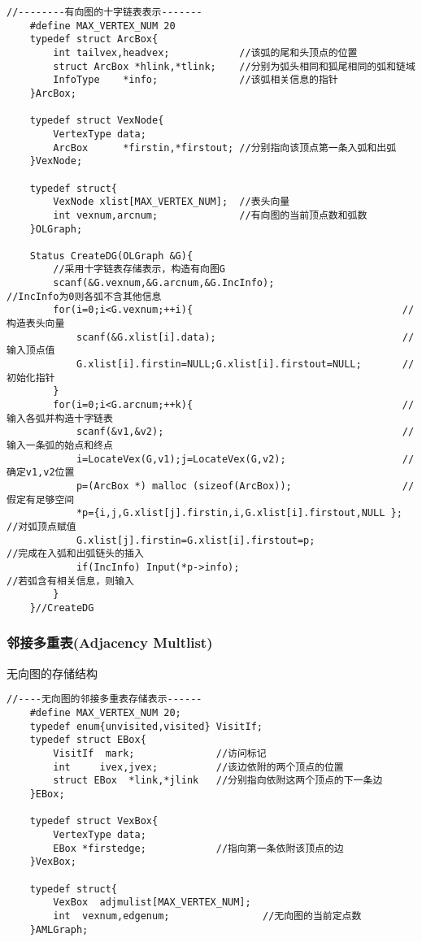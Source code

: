 \documentclass[UTF8]{ctexart}
\begin{document}
\begin{lstlisting}[style=v1]
    //--------有向图的十字链表表示-------
    #define MAX_VERTEX_NUM 20
    typedef struct ArcBox{
        int tailvex,headvex;            //该弧的尾和头顶点的位置
        struct ArcBox *hlink,*tlink;    //分别为弧头相同和狐尾相同的弧和链域
        InfoType    *info;              //该弧相关信息的指针
    }ArcBox;

    typedef struct VexNode{
        VertexType data;
        ArcBox      *firstin,*firstout; //分别指向该顶点第一条入弧和出弧          
    }VexNode;

    typedef struct{
        VexNode xlist[MAX_VERTEX_NUM];  //表头向量
        int vexnum,arcnum;              //有向图的当前顶点数和弧数
    }OLGraph;

    Status CreateDG(OLGraph &G){
        //采用十字链表存储表示，构造有向图G
        scanf(&G.vexnum,&G.arcnum,&G.IncInfo);                      //IncInfo为0则各弧不含其他信息
        for(i=0;i<G.vexnum;++i){                                    //构造表头向量
            scanf(&G.xlist[i].data);                                //输入顶点值
            G.xlist[i].firstin=NULL;G.xlist[i].firstout=NULL;       //初始化指针
        }
        for(i=0;i<G.arcnum;++k){                                    //输入各弧并构造十字链表
            scanf(&v1,&v2);                                         //输入一条弧的始点和终点
            i=LocateVex(G,v1);j=LocateVex(G,v2);                    //确定v1,v2位置
            p=(ArcBox *) malloc (sizeof(ArcBox));                   //假定有足够空间
            *p={i,j,G.xlist[j].firstin,i,G.xlist[i].firstout,NULL }; //对弧顶点赋值 
            G.xlist[j].firstin=G.xlist[i].firstout=p;                //完成在入弧和出弧链头的插入
            if(IncInfo) Input(*p->info);                             //若弧含有相关信息，则输入      
        }
    }//CreateDG
\end{lstlisting}

  
\newpage

\subsubsection{邻接多重表(Adjacency Multlist)}

无向图的存储结构

\begin{lstlisting}[style=v1]
    //----无向图的邻接多重表存储表示------
    #define MAX_VERTEX_NUM 20;
    typedef enum{unvisited,visited} VisitIf;        
    typedef struct EBox{
        VisitIf  mark;              //访问标记
        int     ivex,jvex;          //该边依附的两个顶点的位置
        struct EBox  *link,*jlink   //分别指向依附这两个顶点的下一条边
    }EBox;

    typedef struct VexBox{
        VertexType data;
        EBox *firstedge;            //指向第一条依附该顶点的边
    }VexBox;

    typedef struct{
        VexBox  adjmulist[MAX_VERTEX_NUM];
        int  vexnum,edgenum;                //无向图的当前定点数       
    }AMLGraph;

\end{lstlisting}
\end{document}
